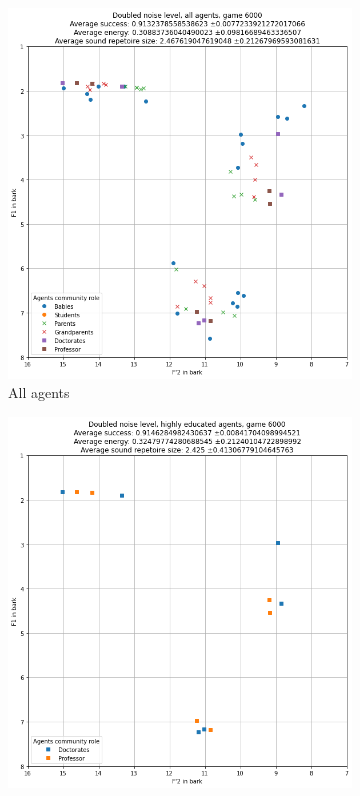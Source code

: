 \begin{figure}[ht]
\begin{subfigure}{.30\textwidth}
        \includegraphics[width=\textwidth]{images/results/double_noise_all.png}
        \captionsetup{width=0.9\linewidth}
        \captionsetup{justification=centering}
        \caption{All agents}
    \end{subfigure}
    \hspace{0.5cm}
    \begin{subfigure}{.30\textwidth}
        \centering
        \includegraphics[width=\textwidth]{images/results/double_noise_high.png}

\end{subfigure}
\end{figure}
